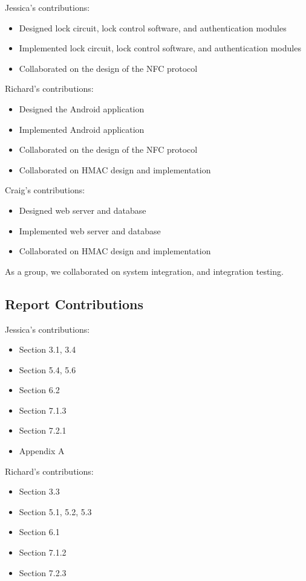 \documentclass[12pt]{report}
\let\Oldsubsection\subsection
\renewcommand{\subsection}{\FloatBarrier\Oldsubsection}
\begin{document}
Jessica's contributions:
\begin{itemize}
    \item Designed lock circuit, lock control software, and authentication modules
    \item Implemented lock circuit, lock control software, and authentication modules
    \item Collaborated on the design of the NFC protocol
\end{itemize}

Richard's contributions:
\begin{itemize}
    \item Designed the Android application
    \item Implemented Android application
    \item Collaborated on the design of the NFC protocol
    \item Collaborated on HMAC design and implementation
\end{itemize}

Craig's contributions:
\begin{itemize}
    \item Designed web server and database
    \item Implemented web server and database
    \item Collaborated on HMAC design and implementation
\end{itemize}

As a group, we collaborated on system integration, and integration testing.


\subsection{Report Contributions} \label{report-contributions}

Jessica's contributions:
\begin{itemize}
    \item Section 3.1, 3.4
    \item Section 5.4, 5.6
    \item Section 6.2
    \item Section 7.1.3
    \item Section 7.2.1
    \item Appendix A
\end{itemize}

Richard's contributions:
\begin{itemize}
    \item Section 3.3
    \item Section 5.1, 5.2, 5.3
    \item Section 6.1
    \item Section 7.1.2
    \item Section 7.2.3
\end{itemize}
\end{document}

